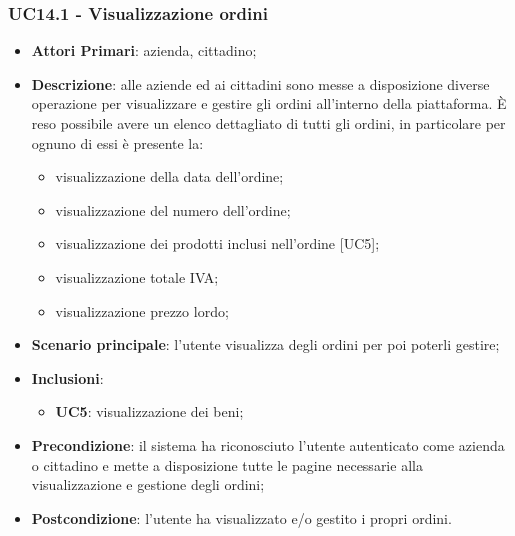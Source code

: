 \subsubsection{UC14.1 - Visualizzazione ordini}
\begin{itemize}
	\item \textbf{Attori Primari}: azienda, cittadino;
	\item \textbf{Descrizione}: alle aziende ed ai cittadini sono messe a disposizione diverse operazione per visualizzare e gestire gli ordini all'interno della piattaforma. \`E reso possibile avere un elenco dettagliato di tutti gli ordini, in particolare per ognuno di essi è presente la:
	\begin{itemize}
		\item visualizzazione della data dell'ordine;
		\item visualizzazione del numero dell'ordine;
		\item visualizzazione dei prodotti inclusi nell'ordine [UC5];
		\item visualizzazione totale IVA;
		\item visualizzazione prezzo lordo\glo;
	\end{itemize}
	\item \textbf{Scenario principale}: l'utente visualizza degli ordini per poi poterli gestire;
	\item \textbf{Inclusioni}:
	\begin{itemize}
		\item \textbf{UC5}: visualizzazione dei beni;
	\end{itemize}
	\item \textbf{Precondizione}: il sistema ha riconosciuto l'utente autenticato come azienda o cittadino e mette a disposizione tutte le pagine necessarie alla visualizzazione e gestione degli ordini;
	\item \textbf{Postcondizione}: l'utente ha visualizzato e/o gestito i propri ordini.
\end{itemize} 

